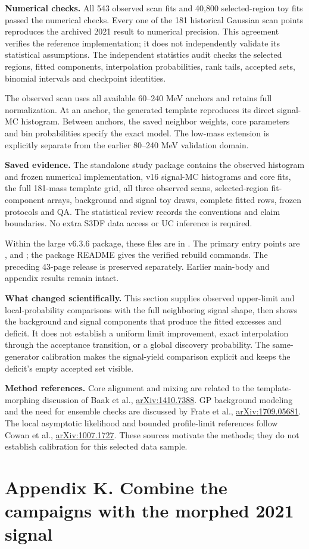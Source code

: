 \documentclass[11pt]{article}
\begin{document}
\textbf{Numerical checks.} All 543 observed scan fits and 40,800 selected-region toy fits passed the numerical checks. Every one of the 181 historical Gaussian scan points reproduces the archived 2021 result to numerical precision. This agreement verifies the reference implementation; it does not independently validate its statistical assumptions. The independent statistics audit checks the selected regions, fitted components, interpolation probabilities, rank tails, accepted sets, binomial intervals and checkpoint identities.

The observed scan uses all available 60--240 MeV anchors and retains full normalization. At an anchor, the generated template reproduces its direct signal-MC histogram. Between anchors, the saved neighbor weights, core parameters and bin probabilities specify the exact model. The low-mass extension is explicitly separate from the earlier 80--240 MeV validation domain.

\textbf{Saved evidence.} The standalone study package contains the observed histogram and frozen numerical implementation, v16 signal-MC histograms and core fits, the full 181-mass template grid, all three observed scans, selected-region fit-component arrays, background and signal toy draws, complete fitted rows, frozen protocols and QA. The statistical review records the conventions and claim boundaries. No extra S3DF data access or UC inference is required.

Within the large v6.3.6 package, these files are in . The primary entry points are ,  and ; the package README gives the verified rebuild commands. The preceding 43-page release is preserved separately. Earlier main-body and appendix results remain intact.

\textbf{What changed scientifically.} This section supplies observed upper-limit and local-probability comparisons with the full neighboring signal shape, then shows the background and signal components that produce the fitted excesses and deficit. It does not establish a uniform limit improvement, exact interpolation through the acceptance transition, or a global discovery probability. The same-generator calibration makes the signal-yield comparison explicit and keeps the deficit's empty accepted set visible.

\textbf{Method references.} Core alignment and mixing are related to the template-morphing discussion of Baak et al., \href{https://arxiv.org/abs/1410.7388}{arXiv:1410.7388}. GP background modeling and the need for ensemble checks are discussed by Frate et al., \href{https://arxiv.org/abs/1709.05681}{arXiv:1709.05681}. The local asymptotic likelihood and bounded profile-limit references follow Cowan et al., \href{https://arxiv.org/abs/1007.1727}{arXiv:1007.1727}. These sources motivate the methods; they do not establish calibration for this selected data sample.
\clearpage\section*{Appendix K. Combine the campaigns with the morphed 2021 signal}
\end{document}
